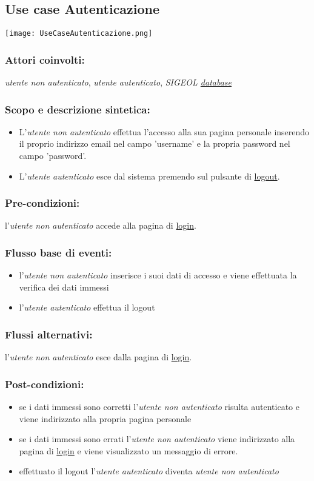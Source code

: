 \documentclass[11pt,a4paper]{article}
\begin{document}
\subsection{Use case Autenticazione}
\begin{center} 
 \texttt{[image: UseCaseAutenticazione.png]}
\end{center}
\subsubsection*{Attori coinvolti:}
\textit{utente non autenticato}, \textit{utente autenticato}, \textit{SIGEOL \underline{database}}
\subsubsection*{Scopo e descrizione sintetica:}
\begin{itemize}
\item L'\textit{utente non autenticato} effettua l'accesso alla sua pagina personale inserendo il proprio indirizzo email nel campo 'username' e la propria password nel campo 'password'.
\item L'\textit{utente autenticato} esce dal sistema premendo sul pulsante di \underline{logout}.                      \end{itemize}
\subsubsection*{Pre-condizioni:}
l'\textit{utente non autenticato} accede alla pagina di \underline{login}.
\subsubsection*{Flusso base di eventi:}
\begin{itemize}
 \item l'\textit{utente non autenticato} inserisce i suoi dati di accesso e viene effettuata la verifica dei dati immessi
\item l'\textit{utente autenticato} effettua il logout 
\end{itemize}
\subsubsection*{Flussi alternativi:}
l'\textit{utente non autenticato} esce dalla pagina di \underline{login}.
\subsubsection*{Post-condizioni:}
\begin{itemize}
 \item se i dati immessi sono corretti l'\textit{utente non autenticato} risulta {autenticato} e viene indirizzato alla propria pagina personale
 \item se i dati immessi sono errati l'\textit{utente non autenticato} viene indirizzato alla pagina di \underline{login} e viene visualizzato un messaggio di errore. 
\item effettuato il logout l'\textit{utente autenticato} diventa \textit{utente non autenticato}
\end{itemize}
\end{document}
